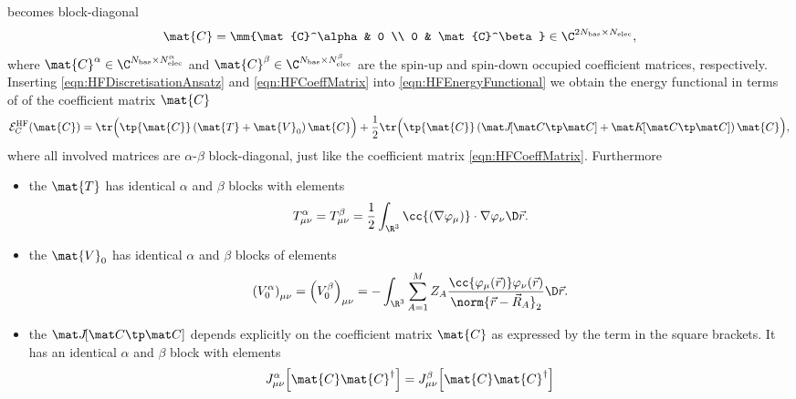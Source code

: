 \begin{rem}
	becomes block-diagonal
	\begin{equation}
		\label{eqn:HFCoeffMatrix}
		\mat{C} = \mm{\mat{C}^\alpha & 0 \\
				0 & \mat{C}^\beta}
			\in \C^{2\Nbas \times \Nelec},
	\end{equation}
	where $\mat{C}^\alpha \in \C^{\Nbas \times \NelecA}$
	and $\mat{C}^\beta \in \C^{\Nbas \times \NelecB}$
	are the spin-up and spin-down occupied coefficient matrices, respectively.
	Inserting \eqref{eqn:HFDiscretisationAnsatz} and \eqref{eqn:HFCoeffMatrix}
	into \eqref{eqn:HFEnergyFunctional}
	we obtain the \HF energy functional in terms of
	of the coefficient matrix $\mat{C}$
	\begin{equation}
		\Ehf_C(\mat{C})
			= \tr \Big( \tp{\mat{C}} \left(\mat{T} + \mat{V}_0 \right) \mat{C} \Big)
			+ \frac12 \tr \Big( \tp{\mat{C}} \left(\matJfull + \matKfull \right) \mat{C} \Big),
		\label{eqn:HFEnergyFunctionalCoeff}
	\end{equation}
	where all involved matrices are $\alpha$-$\beta$ block-diagonal,
	just like the coefficient matrix \eqref{eqn:HFCoeffMatrix}.
	Furthermore
	\begin{itemize}
		\item the 
			$\mat{T}$ has identical $\alpha$ and $\beta$ blocks
			with elements
			\begin{equation}
				T^\alpha_{\mu\nu} = T^\beta_{\mu\nu}
				= \frac12 \int_{\R^3} \cc{\left(\nabla \varphi_\mu\right)}
					\cdot \nabla \varphi_\nu \D\vec{r}.
				\label{eqn:Tbas}
			\end{equation}
		\item the  $\mat{V}_0$
			has identical $\alpha$ and $\beta$ blocks of elements
			\begin{equation}
				\left(V^\alpha_0\right)_{\mu\nu} = \left(V^\beta_0\right)_{\mu\nu}
				= - \int_{\R^3} \sum_{A=1}^M Z_A
				\frac{\cc{\varphi_\mu(\vec{r})} \varphi_\nu(\vec{r})}{\norm{\vec{r} - \vec{R}_A}_2}
				\D \vec{r}.
				\label{eqn:Vbas}
			\end{equation}
		\item the  $\matJfull$
			depends explicitly on the coefficient matrix $\mat{C}$
			as expressed by the term in the square brackets.
			It has an identical $\alpha$ and $\beta$ block with elements
			\begin{equation}
				J_{\mu\nu}^\alpha\!\left[\mat{C}\mat{C}^\dagger\right]
					= J_{\mu\nu}^\beta\!\left[\mat{C}\mat{C}^\dagger\right]

\end{equation}
\end{itemize}
\end{rem}
